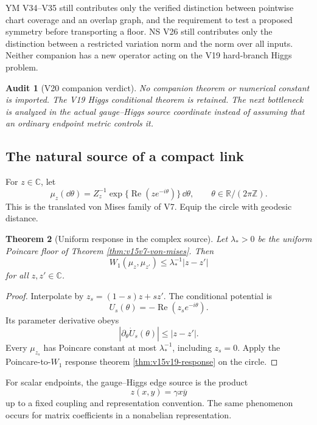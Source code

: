 \documentclass[11pt]{article}
\newtheorem{theorem}{Theorem}[section]
\newtheorem{audit}[theorem]{Audit}
\theoremstyle{remark}
\begin{document}
YM V34--V35 still contributes only the verified distinction between
pointwise chart coverage and an overlap graph, and the requirement
to test a proposed symmetry before transporting a floor.  NS V26
still contributes only the distinction between a restricted
variation norm and the norm over all inputs.  Neither companion has
a new operator acting on the V19 hard-branch Higgs problem.

\begin{audit}[V20 companion verdict]
\label{aud:v15v20-verdict}
No companion theorem or numerical constant is imported.  The V19
Higgs conditional theorem is retained.  The next bottleneck is
analyzed in the actual gauge--Higgs source coordinate instead of
assuming that an ordinary endpoint metric controls it.
\end{audit}

\subsection{The natural source of a compact link}

For \(z\in\mathbb C\), let
\[
 \mu_z(\dd\theta)
 =
 Z_z^{-1}
 \exp\{\operatorname{Re}(ze^{-i\theta})\}\,\dd\theta,
 \qquad\theta\in\mathbb R/(2\pi\mathbb Z).                  \tag{20.3}
\]
This is the translated von Mises family of V7.  Equip the circle
with geodesic distance.

\begin{theorem}[Uniform response in the complex source]
\label{thm:v15v20-source-response}
Let \(\lambda_*>0\) be the uniform Poincare floor of Theorem
\ref{thm:v15v7-von-mises}.  Then
\[
 \boxed{
 W_1(\mu_z,\mu_{z'})
 \le\lambda_*^{-1}|z-z'|}                                  \tag{20.4}
\]
for all \(z,z'\in\mathbb C\).
\end{theorem}

\begin{proof}
Interpolate by \(z_s=(1-s)z+sz'\).  The conditional potential is
\[
 U_s(\theta)=-\operatorname{Re}(z_se^{-i\theta}).
\]
Its parameter derivative obeys
\[
 \left|\partial_\theta\dot U_s(\theta)\right|
 \le|z-z'|.                                                 \tag{20.5}
\]
Every \(\mu_{z_s}\) has Poincare constant at most
\(\lambda_*^{-1}\), including \(z_s=0\).  Apply the
Poincare-to-\(W_1\) response theorem
\ref{thm:v15v19-response} on the circle.
\end{proof}

For scalar endpoints, the gauge--Higgs edge source is the product
\[
 z(x,y)=\gamma x\overline y                                \tag{20.6}
\]
up to a fixed coupling and representation convention.  The same
phenomenon occurs for matrix coefficients in a nonabelian
representation.
\end{document}
